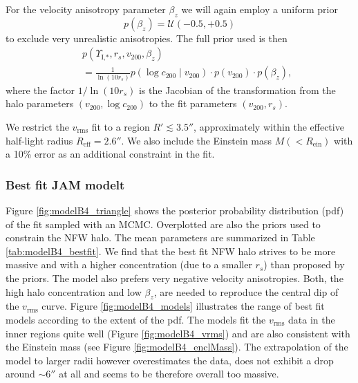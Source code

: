 \documentclass[useAMS,usenatbib]{mnras}
\begin{document}
For the velocity anisotropy parameter $\beta_z$ we will again employ a uniform prior 
\begin{equation*}
p(\beta_z) = \mathscr{U}(-0.5,+0.5)
\end{equation*}
to exclude very unrealistic anisotropies. The full prior used is then
\begin{eqnarray*}
&&p(\Upsilon_\text{I,*},r_s,v_{200},\beta_z) \\
&&= \frac{1}{\ln\left( 10 r_s\right)} p(\log c_{200} \mid v_{200}) \cdot p(v_{200}) \cdot p(\beta_z), 
\end{eqnarray*}
where the factor $1/\ln\left( 10 r_s\right)$ is the Jacobian of the transformation from the halo parameters $(v_{200},\log c_{200})$ to the fit parameters $(v_{200},r_s)$.

We restrict the $v_\text{rms}$ fit to a region $R' \lesssim 3.5''$, approximately within the effective half-light radius $R_\text{eff} = 2.6''$. We also include the Einstein mass $M(<R_\text{ein})$ with a 10\% error as an additional constraint in the fit.

\subsubsection{Best fit JAM modelt} \label{sec:results_JAM_NFW_results}

Figure \ref{fig:modelB4_triangle} shows the posterior probability distribution (pdf) of the fit sampled with an MCMC. Overplotted are also the priors used to constrain the NFW halo. The mean parameters are summarized in Table \ref{tab:modelB4_bestfit}. We find that the best fit NFW halo strives to be more massive and with a higher concentration (due to a smaller $r_s$) than  proposed by the priors. The model also prefers  very negative velocity anisotropies. Both, the high halo concentration and low $\beta_z$, are needed to reproduce the central dip of the $v_\text{rms}$ curve. Figure \ref{fig:modelB4_models} illustrates the range of best fit models according to the extent of the pdf. The models fit the $v_\text{rms}$ data in the inner regions quite well (Figure \ref{fig:modelB4_vrms}) and are also consistent with the Einstein mass (see Figure \ref{fig:modelB4_enclMass}). The extrapolation of the model to larger radii however overestimates the data, does not exhibit a drop around $\sim 6''$ at all and seems to be therefore overall too massive.
\end{document}
